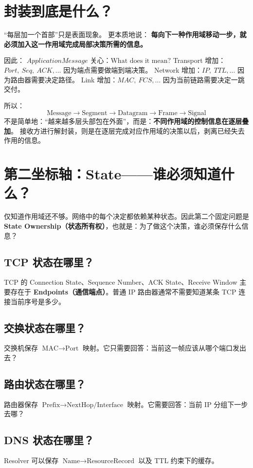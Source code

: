 \documentclass[11pt,a4paper,openany]{ctexbook}
\newcommand{\key}[1]{\textbf{\color{deep}#1}}
\begin{document}
\section{封装到底是什么？}
“每层加一个首部”只是表面现象。
更本质地说：
\key{每向下一种作用域移动一步，就必须加入这一作用域完成局部决策所需的信息。}

因此：
$ApplicationMessage$ 关心：$\text{What does it mean?}$
Transport 增加：$Port,\ Seq,\ ACK,\ldots$ 因为端点需要做端到端决策。
Network 增加：$IP,\ TTL,\ldots$ 因为路由器需要决定路径。
Link 增加：$MAC,\ FCS,\ldots$ 因为当前链路需要决定一跳交付。

所以：
\[
\text{Message} \rightarrow \text{Segment} \rightarrow \text{Datagram} \rightarrow \text{Frame} \rightarrow \text{Signal}
\]
不是简单地：“越来越多层头部包在外面”，而是：\key{不同作用域的控制信息在逐层叠加}。
接收方进行解封装，则是在逐层完成对应作用域的决策以后，剥离已经失去作用的信息。

\section{第二坐标轴：State——谁必须知道什么？}
仅知道作用域还不够。网络中的每个决定都依赖某种状态。因此第二个固定问题是 \key{State Ownership（状态所有权）}，也就是：为了做这个决策，谁必须保存什么信息？

\subsection{TCP 状态在哪里？}
TCP 的 Connection State、Sequence Number、ACK State、Receive Window 主要存在于 \textbf{Endpoints（通信端点）}。普通 IP 路由器通常不需要知道某条 TCP 连接当前序号是多少。

\subsection{交换状态在哪里？}
交换机保存 $\text{MAC} \rightarrow \text{Port}$ 映射。它只需要回答：当前这一帧应该从哪个端口发出去？

\subsection{路由状态在哪里？}
路由器保存 $\text{Prefix} \rightarrow \text{NextHop/Interface}$ 映射。它需要回答：当前 IP 分组下一步去哪？

\subsection{DNS 状态在哪里？}
Resolver 可以保存 $\text{Name} \rightarrow \text{ResourceRecord}$ 以及 TTL 约束下的缓存。
\end{document}
